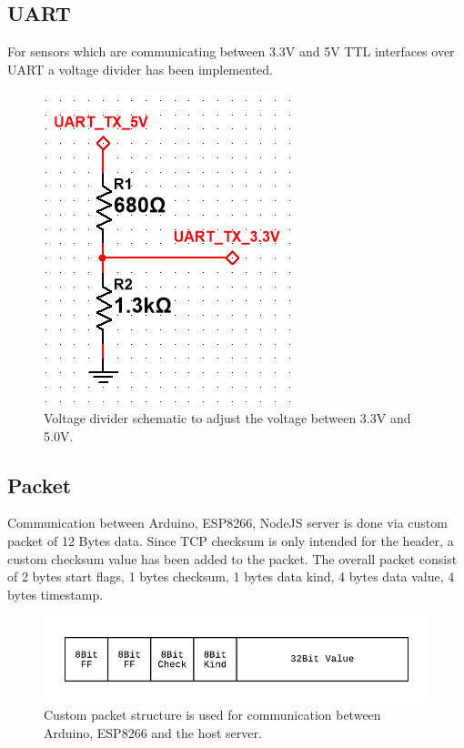 \subsection{UART}
For sensors which are communicating between 3.3V and 5V TTL interfaces over UART a voltage divider has been implemented.
\begin{figure}[p]
    \centering
    \includegraphics[width=0.8\linewidth]{voltage_divider}
    \caption{Voltage divider schematic to adjust the voltage between 3.3V and 5.0V.}
    \label{fig:voltage_divider}
\end{figure}




\subsection{Packet}
Communication between Arduino, ESP8266, NodeJS server is done via custom packet of 12 Bytes data.
Since TCP checksum is only intended for the header, a custom checksum value has been added to the packet.
The overall packet consist of 2 bytes start flags, 1 bytes checksum, 1 bytes data kind, 4 bytes data value, 4 bytes timestamp.

\begin{figure}[p]
    \centering
    \includegraphics[width=\linewidth]{packet1}
    \caption{Custom packet structure is used for communication between Arduino, ESP8266 and the host server.}
    \label{fig:packet1}
\end{figure}


